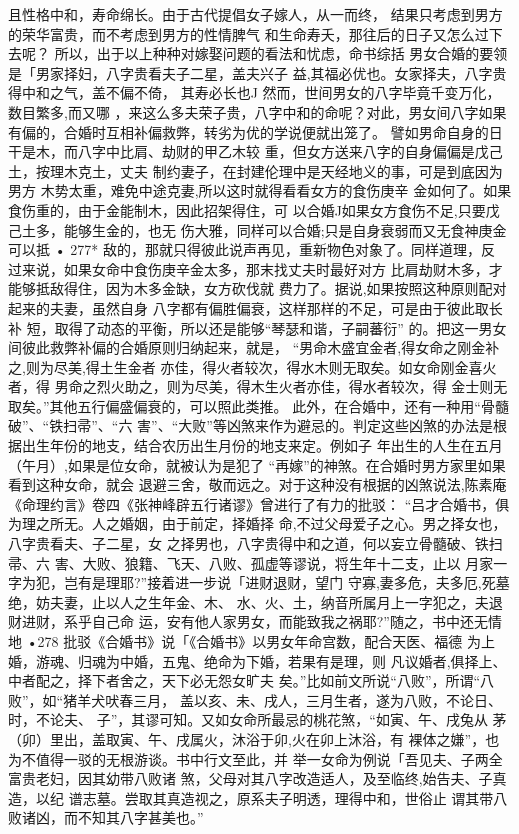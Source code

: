 且性格中和，寿命绵长。由于古代提倡女子嫁人，从一而终，
结果只考虑到男方的荣华富贵，而不考虑到男方的性情脾气
和生命寿夭，那往后的日子又怎么过下去呢？
所以，出于以上种种对嫁娶问题的看法和忧虑，命书综括
男女合婚的要领是「男家择妇，八字贵看夫子二星，盖夫兴子
益,其福必优也。女家择夫，八字贵得中和之气，盖不偏不倚，
其寿必长也J
然而，世间男女的八字毕竟千变万化，数目繁多,而又哪
，来这么多夫荣子贵，八字中和的命呢？对此，男女间八字如果
有偏的，合婚时互相补偏救弊，转劣为优的学说便就出笼了。
譬如男命自身的日干是木，而八字中比肩、劫财的甲乙木较
重，但女方送来八字的自身偏偏是戊己土，按理木克土，丈夫
制约妻子，在封建伦理中是天经地义的事，可是到底因为男方
木势太重，难免中途克妻,所以这时就得看看女方的食伤庚辛
金如何了。如果食伤重的，由于金能制木，因此招架得住，可
以合婚J如果女方食伤不足,只要戊己土多，能够生金的，也无
伤大雅，同样可以合婚;只是自身衰弱而又无食神庚金可以抵
• 277*
敌的，那就只得彼此说声再见，重新物色对象了。同样道理，反
过来说，如果女命中食伤庚辛金太多，那末找丈夫时最好对方
比肩劫财木多，才能够抵敌得住，因为木多金缺，女方砍伐就
费力了。据说,如果按照这种原则配对起来的夫妻，虽然自身
八字都有偏胜偏衰，这样那样的不足，可是由于彼此取长补
短，取得了动态的平衡，所以还是能够“琴瑟和谐，子嗣蕃衍”
的。把这一男女间彼此救弊补偏的合婚原则归纳起来，就是，
“男命木盛宜金者,得女命之刚金补之,则为尽美,得土生金者
亦佳，得火者较次，得水木则无取矣。如女命刚金喜火者，得
男命之烈火助之，则为尽美，得木生火者亦佳，得水者较次，得
金士则无取矣。”其他五行偏盛偏衰的，可以照此类推。
此外，在合婚中，还有一种用“骨髓破”、“铁扫帚”、“六
害”、“大败”等凶煞来作为避忌的。判定这些凶煞的办法是根
据出生年份的地支，结合农历出生月份的地支来定。例如子
年出生的人生在五月（午月）,如果是位女命，就被认为是犯了
“再嫁”的神煞。在合婚时男方家里如果看到这种女命，就会
退避三舍，敬而远之。对于这种没有根据的凶煞说法,陈素庵
《命理约言》卷四《张神峰辟五行诸谬》曾进行了有力的批驳：
“吕才合婚书，俱为理之所无。人之婚姻，由于前定，择婚择
命,不过父母爱子之心。男之择女也，八字贵看夫、子二星，女
之择男也，八字贵得中和之道，何以妄立骨髓破、铁扫帚、六
害、大败、狼籍、飞天、八败、孤虚等谬说，将生年十二支，止以
月家一字为犯，岂有是理耶?”接着进一步说「进财退财，望门
守寡,妻多危，夫多厄,死墓绝，妨夫妻，止以人之生年金、木、
水、火、土，纳音所属月上一字犯之，夫退财进财，系乎自己命
运，安有他人家男女，而能致我之祸耶?”随之，书中还无情地
•278
批驳《合婚书》说「《合婚书》以男女年命宫数，配合天医、福德
为上婚，游魂、归魂为中婚，五鬼、绝命为下婚，若果有是理，则
凡议婚者,俱择上、中者配之，择下者舍之，天下必无怨女旷夫
矣。”比如前文所说“八败”，所谓“八败”，如“猪羊犬吠春三月，
盖以亥、未、戌人，三月生者，遂为八败，不论日、时，不论夫、
子”，其谬可知。又如女命所最忌的桃花煞，“如寅、午、戌兔从
茅（卯）里出，盖取寅、午、戌属火，沐浴于卯,火在卯上沐浴，有
裸体之嫌”，也为不值得一驳的无根游谈。书中行文至此，并
举一女命为例说「吾见夫、子两全富贵老妇，因其幼带八败诸
煞，父母对其八字改造适人，及至临终,始告夫、子真造，以纪
谱志墓。尝取其真造视之，原系夫子明透，理得中和，世俗止
谓其带八败诸凶，而不知其八字甚美也。”

